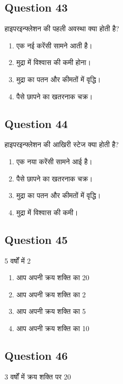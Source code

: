 \documentclass[12pt,a4paper]{article}
\begin{document}
\bigskip


\subsection*{Question 43}
हाइपरइन्फ्लेशन की पहली अवस्था क्या होती है?

\begin{enumerate}[label=\Alph*., leftmargin=*]
\item एक नई करेंसी सामने आती है।
\item मुद्रा में विश्वास की कमी होना।
\item मुद्रा का पतन और कीमतों में वृद्धि।
\item पैसे छापने का खतरनाक चक्र।
\end{enumerate}

\bigskip


\subsection*{Question 44}
हाइपरइन्फ्लेशन की आखिरी स्टेज क्या होती है?

\begin{enumerate}[label=\Alph*., leftmargin=*]
\item एक नया करेंसी सामने आई है।
\item पैसे छापने का खतरनाक चक्र।
\item मुद्रा का पतन और कीमतों में वृद्धि।
\item मुद्रा में विश्वास की कमी।
\end{enumerate}

\bigskip


\subsection*{Question 45}
5 वर्षों में 2%

\begin{enumerate}[label=\Alph*., leftmargin=*]
\item आप अपनी क्रय शक्ति का 20%
\item आप अपनी क्रय शक्ति का 2%
\item आप अपनी क्रय शक्ति का 5%
\item आप अपनी क्रय शक्ति का 10%
\end{enumerate}

\bigskip


\subsection*{Question 46}
3 वर्षों में क्रय शक्ति पर 20%
\end{document}
